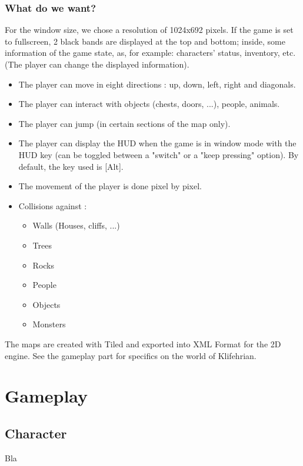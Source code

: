 \documentclass[a4paper,12pt]{book}
\begin{document}
\section*{What do we want?}
For the window size, we chose a resolution of 1024x692 pixels. If the game is set to fullscreen, 2 black bands are displayed at the top and bottom; inside, some information of the game state, as, for example: characters' status, inventory, etc. (The player can change the displayed information).
\begin{itemize}
	\item The player can move in eight directions : up, down, left, right and diagonals.
	\item The player can interact with objects (chests, doors, ...), people, animals.
	\item The player can jump (in certain sections of the map only).
	\item The player can display the HUD when the game is in window mode with the HUD key (can be toggled between a "switch" or a "keep pressing" option). By default, the key used is [Alt].
	\item The movement of the player is done pixel by pixel.
	\item Collisions against :
\begin{itemize}
	\item Walls (Houses, cliffs, ...)
	\item Trees
	\item Rocks
	\item People
	\item Objects
	\item Monsters
\end{itemize}
\end{itemize}
The maps are created with Tiled and exported into XML Format for the 2D engine. See the gameplay part for specifics on the world of Klifehrian.
\part{Gameplay}
\chapter{Character}
Bla
\end{document}
